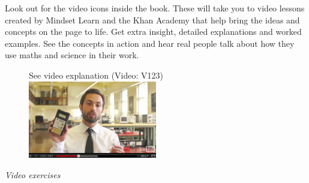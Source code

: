 {\Large

Look out for the video icons inside the book. These will take you to video lessons created by Mindset
Learn and the Khan Academy that help bring the ideas and concepts on the page to life. Get extra insight, detailed
explanations and worked examples. See the concepts in action and hear real people talk about how they
use maths and science in their work. \par

\begin{figure}[h]
\begin{center}
See video explanation  (Video: V123)\\
\includegraphics[width=0.5\textwidth]{../title_images/veritasiumvideo.png}
\end{center}
\end{figure}

}
\vspace{0.5cm}
{\normalfont\sffamily\fontsize{22}\normalfont\itshape Video exercises} \par

